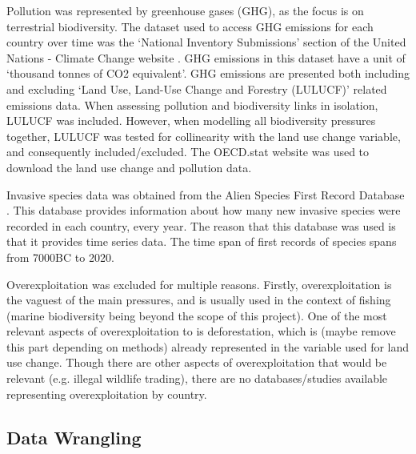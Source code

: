 \documentclass[11pt, a4paper, titlepage]{article}
\begin{document}
	Pollution was represented by greenhouse gases (GHG), as the focus is on terrestrial biodiversity. The dataset used to access GHG emissions for each country over time was the `National Inventory Submissions' section of the United Nations - Climate Change website \citep{united nations}. GHG emissions in this dataset have a unit of `thousand tonnes of CO2 equivalent'. GHG emissions are presented both including and excluding `Land Use, Land-Use Change and Forestry (LULUCF)' related emissions data. When assessing pollution and biodiversity links in isolation, LULUCF was included. However, when modelling all biodiversity pressures together, LULUCF was tested for collinearity with the land use change variable, and consequently included/excluded. The OECD.stat website was used to download the land use change and pollution data. \newline
	
	Invasive species data was obtained from the Alien Species First Record Database \citep{seebens2017no, seebens2018global}. This database provides information about how many new invasive species were recorded in each country, every year. The reason that this database was used is that it provides time series data. The time span of first records of species spans from 7000BC to 2020.   \newline 
	
	Overexploitation was excluded for multiple reasons. Firstly, overexploitation is the vaguest of the main pressures, and is usually used in the context of fishing (marine biodiversity being beyond the scope of this project). One of the most relevant aspects of overexploitation to is deforestation, which is (maybe remove this part depending on methods) already represented in the variable used for land use change. Though there are other aspects of overexploitation that would be relevant (e.g. illegal wildlife trading), there are no databases/studies available representing overexploitation by country.



	
	\subsection*{Data Wrangling}
	
\end{document}
